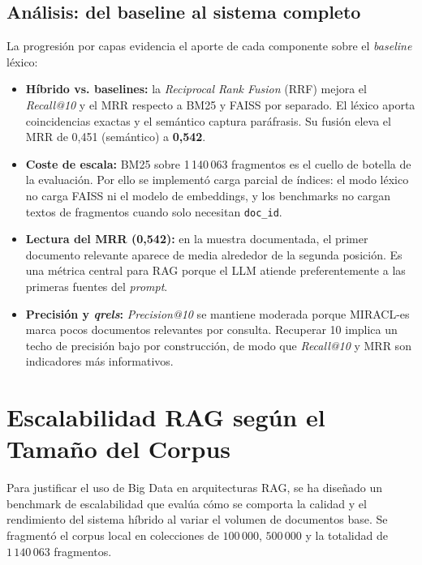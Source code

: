 \documentclass[11pt,a4paper]{article}
\newcommand{\code}[1]{\texttt{#1}}
\begin{document}
\subsection{Análisis: del baseline al sistema completo}

La progresión por capas evidencia el aporte de cada componente sobre el \textit{baseline} léxico:

\begin{itemize}
  \item \textbf{Híbrido vs. baselines:} la \textit{Reciprocal Rank Fusion} (RRF) mejora el \textit{Recall@10} y el MRR respecto a BM25 y FAISS por separado. El léxico aporta coincidencias exactas y el semántico captura paráfrasis. Su fusión eleva el MRR de 0,451 (semántico) a \textbf{0,542}.
  \item \textbf{Coste de escala:} BM25 sobre 1\,140\,063 fragmentos es el cuello de botella de la evaluación. Por ello se implementó carga parcial de índices: el modo léxico no carga FAISS ni el modelo de embeddings, y los benchmarks no cargan textos de fragmentos cuando solo necesitan \code{doc\_id}.
  \item \textbf{Lectura del MRR (0,542):} en la muestra documentada, el primer documento relevante aparece de media alrededor de la segunda posición. Es una métrica central para RAG porque el LLM atiende preferentemente a las primeras fuentes del \textit{prompt}.
  \item \textbf{Precisión y \textit{qrels}:} \textit{Precision@10} se mantiene moderada porque MIRACL-es marca pocos documentos relevantes por consulta. Recuperar 10 implica un techo de precisión bajo por construcción, de modo que \textit{Recall@10} y MRR son indicadores más informativos.
\end{itemize}

\FloatBarrier

\section{Escalabilidad RAG según el Tamaño del Corpus}

Para justificar el uso de Big Data en arquitecturas RAG, se ha diseñado un benchmark de escalabilidad que evalúa cómo se comporta la calidad y el rendimiento del sistema híbrido al variar el volumen de documentos base. Se fragmentó el corpus local en colecciones de $100\,000$, $500\,000$ y la totalidad de $1\,140\,063$ fragmentos.
\end{document}
